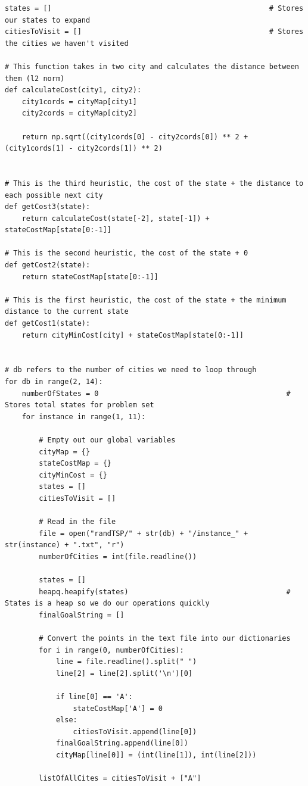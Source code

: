 \documentclass{article}
\begin{document}
\begin{titlepage}
\begin{lstlisting}
states = []                                                   # Stores our states to expand
citiesToVisit = []                                            # Stores the cities we haven't visited

# This function takes in two city and calculates the distance between them (l2 norm)
def calculateCost(city1, city2):
    city1cords = cityMap[city1]
    city2cords = cityMap[city2]

    return np.sqrt((city1cords[0] - city2cords[0]) ** 2 + (city1cords[1] - city2cords[1]) ** 2)


# This is the third heuristic, the cost of the state + the distance to each possible next city
def getCost3(state):
    return calculateCost(state[-2], state[-1]) + stateCostMap[state[0:-1]]

# This is the second heuristic, the cost of the state + 0
def getCost2(state):
    return stateCostMap[state[0:-1]]

# This is the first heuristic, the cost of the state + the minimum distance to the current state
def getCost1(state):
    return cityMinCost[city] + stateCostMap[state[0:-1]]


# db refers to the number of cities we need to loop through
for db in range(2, 14):
    numberOfStates = 0                                            # Stores total states for problem set
    for instance in range(1, 11):

        # Empty out our global variables
        cityMap = {}
        stateCostMap = {}
        cityMinCost = {}
        states = []
        citiesToVisit = []

        # Read in the file
        file = open("randTSP/" + str(db) + "/instance_" + str(instance) + ".txt", "r")
        numberOfCities = int(file.readline())

        states = []
        heapq.heapify(states)                                     # States is a heap so we do our operations quickly
        finalGoalString = []

        # Convert the points in the text file into our dictionaries
        for i in range(0, numberOfCities):
            line = file.readline().split(" ")
            line[2] = line[2].split('\n')[0]

            if line[0] == 'A':
                stateCostMap['A'] = 0
            else:
                citiesToVisit.append(line[0])
            finalGoalString.append(line[0])
            cityMap[line[0]] = (int(line[1]), int(line[2]))

        listOfAllCites = citiesToVisit + ["A"]


\end{lstlisting}
\end{titlepage}
\end{document}
